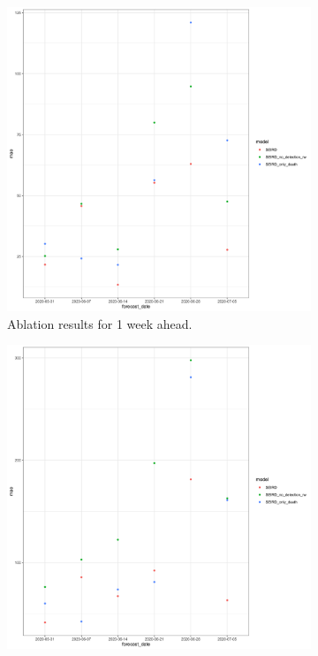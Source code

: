 \documentclass[11pt]{amsart}
\begin{document}
\begin{figure}
  \centering
     \begin{subfigure}{.5\textwidth}
  \centering
    \includegraphics[scale=.05]{ablation_1.png}
    \caption{Ablation results for 1 week ahead.}
\end{subfigure}%
\begin{subfigure}{.5\textwidth}
  \centering
    \includegraphics[scale=.05]{ablation_2.png}

\end{subfigure}
\end{figure}
\end{document}
